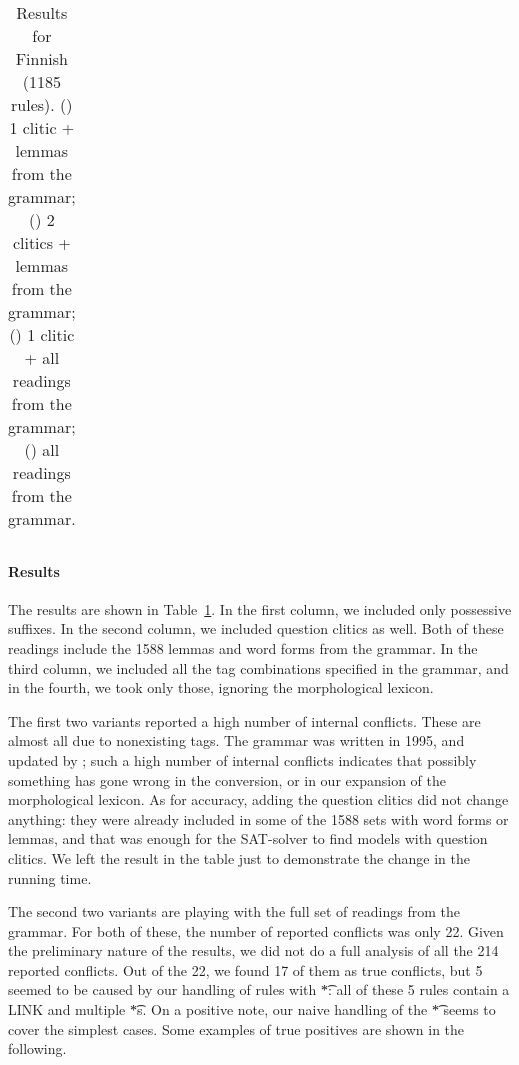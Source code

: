 {{\begin{table}[t]
\begin{tabular}{| p{\wH} @{~+~} p{\wH}  | r @{~+~} l  | r @{~+~} l  | r @{~+~} l  | r @{~+~} l  |}
\end{tabular}
\caption{Results for Finnish (1185 rules). 
(\oneClLG) 1 clitic + lemmas from the grammar; 
(\twoClLG) 2 clitics + lemmas from the grammar;  
(\oneClRG) 1 clitic + all readings from the grammar;
(\allRG) all readings from the grammar. }
\label{table:resFin}
\end{table}

\paragraph{Results}
The results are shown in Table~\ref{table:resFin}.
In the first column, we included only possessive suffixes. In the second column, we included question clitics as well.
Both of these readings include the 1588 lemmas and word forms from the grammar.
In the third column, we included all the tag combinations specified in the grammar, and in the fourth, we took only those, ignoring the morphological lexicon.

The first two variants reported a high number of internal conflicts. 
These are almost all due to nonexisting tags. The grammar was written in 1995, and updated by ; such a high number of internal conflicts indicates that possibly something has gone wrong in the conversion, or in our expansion of the morphological lexicon.
As for accuracy, adding the question clitics did not change anything: they were already included in some of the 1588 sets with word forms or lemmas, and that was enough for the SAT-solver to find models with question clitics.
We left the result in the table just to demonstrate the change in the running time.


The second two variants are playing with the full set of readings from the grammar. For both of these, the number of reported conflicts was only 22.
Given the preliminary nature of the results, we did not do a full analysis of all the 214 reported conflicts.
Out of the 22, we found 17 of them as true conflicts,
 but 5 seemed to be caused by our handling of rules with \t{*}: all of these 5 rules contain a LINK and multiple \t{*}s. On a positive note, our naive handling of the \t{*} seems to cover the simplest cases.
Some examples of true positives are shown in the following.


}}
